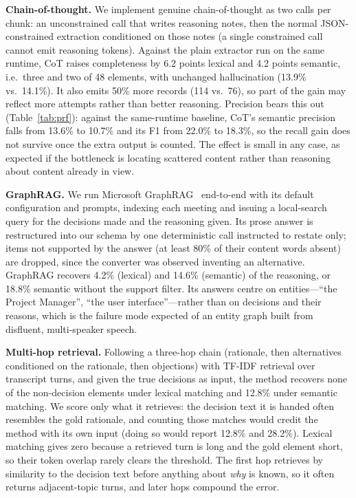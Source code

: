 \documentclass[conference]{IEEEtran}
\begin{document}
\textbf{Chain-of-thought.} We implement genuine chain-of-thought as two calls per
chunk: an unconstrained call that writes reasoning notes, then the normal
JSON-constrained extraction conditioned on those notes (a single constrained
call cannot emit reasoning tokens). Against the plain extractor run on the same
runtime, CoT raises completeness by 6.2 points lexical and 4.2 points semantic,
i.e.\ three and two of 48 elements, with unchanged hallucination (13.9\% vs.\
14.1\%). It also emits 50\% more records (114 vs.\ 76), so part of the gain may
reflect more attempts rather than better reasoning. Precision bears this out
(Table~\ref{tab:prf}): against the same-runtime baseline, CoT's semantic
precision falls from 13.6\% to 10.7\% and its F1 from 22.0\% to 18.3\%, so the
recall gain does not survive once the extra output is counted. The effect is
small in any case, as expected if the bottleneck is locating scattered content
rather than reasoning about content already in view.

\textbf{GraphRAG.} We run Microsoft GraphRAG~\cite{edge2024graphrag} end-to-end
with its default configuration and prompts, indexing each meeting and issuing a
local-search query for the decisions made and the reasoning given. Its prose
answer is restructured into our schema by one deterministic call instructed to
restate only; items not supported by the answer (at least 80\% of their content
words absent) are dropped, since the converter was observed inventing an
alternative. GraphRAG recovers 4.2\% (lexical) and 14.6\% (semantic) of the
reasoning, or 18.8\% semantic without the support filter. Its answers centre on
entities---``the Project Manager'', ``the user interface''---rather than on
decisions and their reasons, which is the failure mode expected of an entity
graph built from disfluent, multi-speaker speech.

\textbf{Multi-hop retrieval.} Following a three-hop chain (rationale, then
alternatives conditioned on the rationale, then objections) with TF-IDF
retrieval over transcript turns, and given the true decisions as input, the
method recovers none of the non-decision elements under lexical matching and
12.8\% under semantic matching. We score only what it retrieves: the decision
text it is handed often resembles the gold rationale, and counting those matches
would credit the method with its own input (doing so would report 12.8\% and
28.2\%). Lexical matching gives zero because a retrieved turn is long and the
gold element short, so their token overlap rarely clears the threshold. The first
hop retrieves by similarity to the decision text before anything about
\emph{why} is known, so it often returns adjacent-topic turns, and later hops
compound the error.
\end{document}
